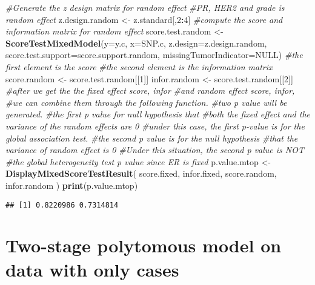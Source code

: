 \documentclass[11pt,]{article}
\newenvironment{Shaded}{\begin{snugshade}}{\end{snugshade}}
\newcommand{\CommentTok}[1]{\textcolor[rgb]{0.56,0.35,0.01}{\textit{#1}}}
\newcommand{\DataTypeTok}[1]{\textcolor[rgb]{0.13,0.29,0.53}{#1}}
\newcommand{\DecValTok}[1]{\textcolor[rgb]{0.00,0.00,0.81}{#1}}
\newcommand{\KeywordTok}[1]{\textcolor[rgb]{0.13,0.29,0.53}{\textbf{#1}}}
\newcommand{\NormalTok}[1]{#1}
\newcommand{\OperatorTok}[1]{\textcolor[rgb]{0.81,0.36,0.00}{\textbf{#1}}}
\newcommand{\OtherTok}[1]{\textcolor[rgb]{0.56,0.35,0.01}{#1}}
\newcommand{\StringTok}[1]{\textcolor[rgb]{0.31,0.60,0.02}{#1}}
\begin{document}
\begin{Shaded}
\begin{Highlighting}[]
\CommentTok{#Generate the z design matrix for random effect}
\CommentTok{#PR, HER2 and grade is random effect}
\NormalTok{z.design.random <-}\StringTok{ }\NormalTok{z.standard[,}\DecValTok{2}\OperatorTok{:}\DecValTok{4}\NormalTok{]}
\CommentTok{#compute the score and information matrix for random effect}
\NormalTok{score.test.random <-}\StringTok{ }\KeywordTok{ScoreTestMixedModel}\NormalTok{(}\DataTypeTok{y=}\NormalTok{y.c,}
                                         \DataTypeTok{x=}\NormalTok{SNP.c,}
                                         \DataTypeTok{z.design=}\NormalTok{z.design.random,}
                                         \DataTypeTok{score.test.support=}\NormalTok{score.support.random,}
                                         \DataTypeTok{missingTumorIndicator=}\OtherTok{NULL}\NormalTok{)}
\CommentTok{#the first element is the score}
\CommentTok{#the second element is the information matrix}
\NormalTok{score.random <-}\StringTok{ }\NormalTok{score.test.random[[}\DecValTok{1}\NormalTok{]]}
\NormalTok{infor.random <-}\StringTok{ }\NormalTok{score.test.random[[}\DecValTok{2}\NormalTok{]]}
\CommentTok{#after we get the the fixed effect score, infor }
\CommentTok{#and random effect score, infor, }
\CommentTok{#we can combine them through the following function. }
\CommentTok{#two p value will be generated.}
\CommentTok{#the first p value for null hypothesis that}
\CommentTok{#both the fixed effect and the variance of the random effects are 0}
\CommentTok{#under this case, the first p-value is for the global association test.}
\CommentTok{#the second p value is for the null hypothesis }
\CommentTok{#that the variance of random effect is 0}
\CommentTok{#Under this situation, the second p value is NOT }
\CommentTok{#the global heterogeneity test p value since ER is fixed}
\NormalTok{p.value.mtop <-}\StringTok{ }\KeywordTok{DisplayMixedScoreTestResult}\NormalTok{(}
\NormalTok{  score.fixed,}
\NormalTok{  infor.fixed,}
\NormalTok{  score.random,}
\NormalTok{  infor.random}
\NormalTok{)  }
\KeywordTok{print}\NormalTok{(p.value.mtop)}
\end{Highlighting}
\end{Shaded}

\begin{verbatim}
## [1] 0.8220986 0.7314814
\end{verbatim}

\hypertarget{two-stage-polytomous-model-on-data-with-only-cases}{%
\section{Two-stage polytomous model on data with only
cases}\label{two-stage-polytomous-model-on-data-with-only-cases}}
\end{document}
